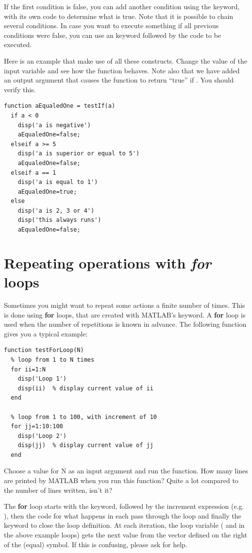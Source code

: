\documentclass{article}
\begin{document}
If the first condition is false, you can add another condition using the  keyword, with its own code to determine what is true.
Note that it is possible to chain several  conditions.
In case you want to execute something if all previous conditions were false, you can use an  keyword followed by the code to be executed.

Here is an example that make use of all these constructs.
Change the value of the input variable  and see how the function behaves.
Note also that we have added an output argument that causes the function to return ``true'' if . 
You should verify this. 
\begin{lstlisting}
function aEqualedOne = testIf(a)
  if a < 0
    disp('a is negative')
    aEqualedOne=false;
  elseif a >= 5
    disp('a is superior or equal to 5')
    aEqualedOne=false;
  elseif a == 1
    disp('a is equal to 1')
    aEqualedOne=true;
  else
    disp('a is 2, 3 or 4')
    disp('this always runs')
    aEqualedOne=false;
\end{lstlisting}




\section{Repeating operations with \emph{for} loops}

Sometimes you might want to repeat some actions a finite number of times.
This is done using \textbf{for} loops, that are created with MATLAB's  keyword.
A \textbf{for} loop is used when the number of repetitions is known in advance.
The following function gives you a typical example:
\begin{lstlisting}
function testForLoop(N)
  % loop from 1 to N times
  for ii=1:N
    disp('Loop 1')
    disp(ii)  % display current value of ii
  end

  % loop from 1 to 100, with increment of 10
  for jj=1:10:100
    disp('Loop 2')
    disp(jj)  % display current value of jj
  end
\end{lstlisting}

Choose a value for N as an input argument and run the function.
How many lines are printed by MATLAB when you run this function?
Quite a lot compared to the number of lines written, isn't it?

The \textbf{for} loop starts with the  keyword, followed by the increment expression (e.g. ), then the code for what happens in each pass through the loop and finally the  keyword to close the loop definition.
At each iteration, the loop variable ( and  in the above example loops) gets the next value from the vector defined on the right of the \mcode{=} (equal) symbol. If this is confusing, please ask for help.
\end{document}

